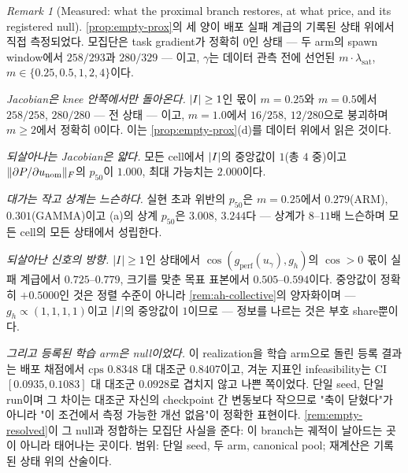 \documentclass[11pt]{article}
\theoremstyle{plain}
\theoremstyle{definition}
\theoremstyle{remark}
\newtheorem{remark}[theorem]{Remark}
\DeclarePairedDelimiter{\norm}{\lVert}{\rVert}
\DeclarePairedDelimiter{\abs}{\lvert}{\rvert}
\begin{document}
\begin{remark}[Measured: what the proximal branch restores, at what price, and its registered null]\label{rem:empty-prox-measured}
\cref{prop:empty-prox}의 세 양이 배포 실패 계급의 기록된 상태 위에서 직접 측정되었다. 모집단은
task gradient가 정확히 $0$인 상태 --- 두 arm의 spawn window에서 $258/293$과 $280/329$ --- 이고,
$\gamma$는 데이터 관측 전에 선언된 $m\cdot\lambda_{\mathrm{sat}}$, $m\in\{0.25,0.5,1,2,4\}$이다.

\emph{Jacobian은 knee 안쪽에서만 돌아온다.} $\abs I\ge1$인 몫이 $m=0.25$와 $m=0.5$에서
$258/258$, $280/280$ --- 전 상태 --- 이고, $m=1.0$에서 $16/258$, $12/280$으로 붕괴하며
$m\ge2$에서 정확히 $0$이다. 이는 \cref{prop:empty-prox}(d)를 데이터 위에서 읽은 것이다.

\emph{되살아나는 Jacobian은 얇다.} 모든 cell에서 $\abs I$의 중앙값이 $1$(총 $4$ 중)이고
$\norm{\partial P/\partial u_{\mathrm{nom}}}_F$의 $p_{50}$이 $1.000$, 최대 가능치는 $2.000$이다.

\emph{대가는 작고 상계는 느슨하다.} 실현 초과 위반의 $p_{50}$은 $m=0.25$에서 $0.279$(ARM),
$0.301$(GAMMA)이고 (a)의 상계 $p_{50}$은 $3.008$, $3.244$다 --- 상계가 $8$--$11$배 느슨하며
모든 cell의 모든 상태에서 성립한다.

\emph{되살아난 신호의 방향.} $\abs I\ge1$인 상태에서 $\cos(g_{\mathrm{perf}}(u_\gamma),g_h)$의
$\cos>0$ 몫이 실패 계급에서 $0.725$--$0.779$, 크기를 맞춘 목표 표본에서 $0.505$--$0.594$이다.
중앙값이 정확히 $+0.5000$인 것은 정렬 수준이 아니라 \cref{rem:ah-collective}의 양자화이며 ---
$g_h\propto(1,1,1,1)$이고 $\abs I$의 중앙값이 $1$이므로 --- 정보를 나르는 것은 부호 share뿐이다.

\emph{그리고 등록된 학습 arm은 null이었다.} 이 realization을 학습 arm으로 돌린 등록 결과는
배포 채점에서 $\mathrm{cps}$ $0.8348$ 대 대조군 $0.8407$이고, 겨눈 지표인 infeasibility는
CI $[0.0935,0.1083]$ 대 대조군 $0.0928$로 겹치지 않고 나쁜 쪽이었다. 단일 seed, 단일 run이며
그 차이는 대조군 자신의 checkpoint 간 변동보다 작으므로 "축이 닫혔다"가 아니라 "이 조건에서
측정 가능한 개선 없음"이 정확한 표현이다. \cref{rem:empty-resolved}이 그 null과 정합하는
모집단 사실을 준다: 이 branch는 궤적이 날아드는 곳이 아니라 태어나는 곳이다.
범위: 단일 seed, 두 arm, canonical pool; 재계산은 기록된 상태 위의 산술이다.
\end{remark}
\end{document}
